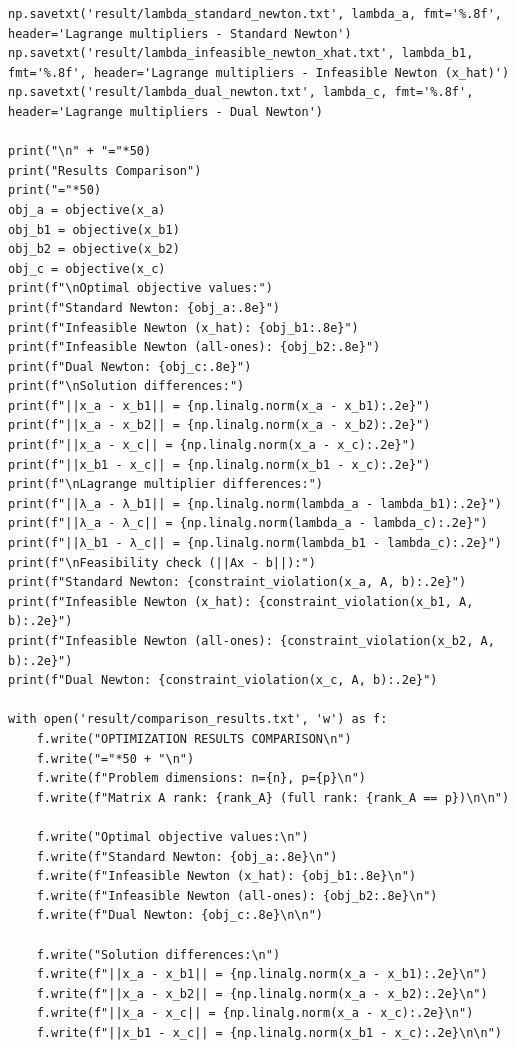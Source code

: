 \documentclass{article}
\newenvironment{solution_cn}{%
  \begin{proof}[解答]%
  \kaishu  %
}{%
  \end{proof}%
}
\begin{document}
\begin{solution_cn}
\begin{lstlisting}[caption={run.py}]
np.savetxt('result/lambda_standard_newton.txt', lambda_a, fmt='%.8f', header='Lagrange multipliers - Standard Newton')
np.savetxt('result/lambda_infeasible_newton_xhat.txt', lambda_b1, fmt='%.8f', header='Lagrange multipliers - Infeasible Newton (x_hat)')
np.savetxt('result/lambda_dual_newton.txt', lambda_c, fmt='%.8f', header='Lagrange multipliers - Dual Newton')

print("\n" + "="*50)
print("Results Comparison")
print("="*50)
obj_a = objective(x_a)
obj_b1 = objective(x_b1)
obj_b2 = objective(x_b2)
obj_c = objective(x_c)
print(f"\nOptimal objective values:")
print(f"Standard Newton: {obj_a:.8e}")
print(f"Infeasible Newton (x_hat): {obj_b1:.8e}")
print(f"Infeasible Newton (all-ones): {obj_b2:.8e}")
print(f"Dual Newton: {obj_c:.8e}")
print(f"\nSolution differences:")
print(f"||x_a - x_b1|| = {np.linalg.norm(x_a - x_b1):.2e}")
print(f"||x_a - x_b2|| = {np.linalg.norm(x_a - x_b2):.2e}")
print(f"||x_a - x_c|| = {np.linalg.norm(x_a - x_c):.2e}")
print(f"||x_b1 - x_c|| = {np.linalg.norm(x_b1 - x_c):.2e}")
print(f"\nLagrange multiplier differences:")
print(f"||λ_a - λ_b1|| = {np.linalg.norm(lambda_a - lambda_b1):.2e}")
print(f"||λ_a - λ_c|| = {np.linalg.norm(lambda_a - lambda_c):.2e}")
print(f"||λ_b1 - λ_c|| = {np.linalg.norm(lambda_b1 - lambda_c):.2e}")
print(f"\nFeasibility check (||Ax - b||):")
print(f"Standard Newton: {constraint_violation(x_a, A, b):.2e}")
print(f"Infeasible Newton (x_hat): {constraint_violation(x_b1, A, b):.2e}")
print(f"Infeasible Newton (all-ones): {constraint_violation(x_b2, A, b):.2e}")
print(f"Dual Newton: {constraint_violation(x_c, A, b):.2e}")

with open('result/comparison_results.txt', 'w') as f:
    f.write("OPTIMIZATION RESULTS COMPARISON\n")
    f.write("="*50 + "\n")
    f.write(f"Problem dimensions: n={n}, p={p}\n")
    f.write(f"Matrix A rank: {rank_A} (full rank: {rank_A == p})\n\n")
    
    f.write("Optimal objective values:\n")
    f.write(f"Standard Newton: {obj_a:.8e}\n")
    f.write(f"Infeasible Newton (x_hat): {obj_b1:.8e}\n")
    f.write(f"Infeasible Newton (all-ones): {obj_b2:.8e}\n")
    f.write(f"Dual Newton: {obj_c:.8e}\n\n")
    
    f.write("Solution differences:\n")
    f.write(f"||x_a - x_b1|| = {np.linalg.norm(x_a - x_b1):.2e}\n")
    f.write(f"||x_a - x_b2|| = {np.linalg.norm(x_a - x_b2):.2e}\n")
    f.write(f"||x_a - x_c|| = {np.linalg.norm(x_a - x_c):.2e}\n")
    f.write(f"||x_b1 - x_c|| = {np.linalg.norm(x_b1 - x_c):.2e}\n\n")
    

\end{lstlisting}
\end{solution_cn}
\end{document}
